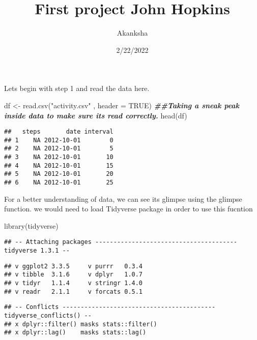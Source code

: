 \documentclass[
]{article}
\title{First project John Hopkins}
\author{Akanksha}
\date{2/22/2022}
\newenvironment{Shaded}{\begin{snugshade}}{\end{snugshade}}
\newcommand{\AttributeTok}[1]{\textcolor[rgb]{0.77,0.63,0.00}{#1}}
\newcommand{\ConstantTok}[1]{\textcolor[rgb]{0.00,0.00,0.00}{#1}}
\newcommand{\DocumentationTok}[1]{\textcolor[rgb]{0.56,0.35,0.01}{\textbf{\textit{#1}}}}
\newcommand{\FunctionTok}[1]{\textcolor[rgb]{0.00,0.00,0.00}{#1}}
\newcommand{\NormalTok}[1]{#1}
\newcommand{\OtherTok}[1]{\textcolor[rgb]{0.56,0.35,0.01}{#1}}
\newcommand{\StringTok}[1]{\textcolor[rgb]{0.31,0.60,0.02}{#1}}
\begin{document}
\maketitle

Lets begin with step 1 and read the data here.

\begin{Shaded}
\begin{Highlighting}[]
\NormalTok{df }\OtherTok{\textless{}{-}} \FunctionTok{read.csv}\NormalTok{(}\StringTok{"activity.csv"}\NormalTok{ , }\AttributeTok{header =} \ConstantTok{TRUE}\NormalTok{)}
\DocumentationTok{\#\#Taking a sneak peak inside data to make sure its read correctly.}
\FunctionTok{head}\NormalTok{(df)}
\end{Highlighting}
\end{Shaded}

\begin{verbatim}
##   steps       date interval
## 1    NA 2012-10-01        0
## 2    NA 2012-10-01        5
## 3    NA 2012-10-01       10
## 4    NA 2012-10-01       15
## 5    NA 2012-10-01       20
## 6    NA 2012-10-01       25
\end{verbatim}

For a better understanding of data, we can see its glimpse using the
glimpse function. we would need to load Tidyverse package in order to
use this fucntion

\begin{Shaded}
\begin{Highlighting}[]
\FunctionTok{library}\NormalTok{(tidyverse)}
\end{Highlighting}
\end{Shaded}

\begin{verbatim}
## -- Attaching packages --------------------------------------- tidyverse 1.3.1 --
\end{verbatim}

\begin{verbatim}
## v ggplot2 3.3.5     v purrr   0.3.4
## v tibble  3.1.6     v dplyr   1.0.7
## v tidyr   1.1.4     v stringr 1.4.0
## v readr   2.1.1     v forcats 0.5.1
\end{verbatim}

\begin{verbatim}
## -- Conflicts ------------------------------------------ tidyverse_conflicts() --
## x dplyr::filter() masks stats::filter()
## x dplyr::lag()    masks stats::lag()
\end{verbatim}
\end{document}
